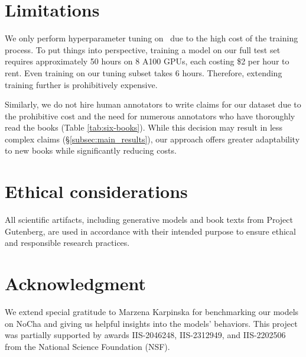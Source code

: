 \section*{Limitations}
We only perform hyperparameter tuning on \prolongbase\ due to the high cost of the training process. To put things into perspective, training a model on our full test set requires approximately 50 hours on 8 A100 GPUs, each costing \$2 per hour to rent. Even training on our tuning subset takes 6 hours. Therefore, extending training further is prohibitively expensive. 

Similarly, we do not hire human annotators to write claims for our dataset due to the prohibitive cost and the need for numerous annotators who have thoroughly read the books (Table \ref{tab:six-books}). While this decision may result in less complex claims (\S\ref{subsec:main_results}), our approach offers greater adaptability to new books while significantly reducing costs.

\section*{Ethical considerations}
All scientific artifacts, including generative models and book texts from Project Gutenberg, are used in accordance with their intended purpose to ensure ethical and responsible research practices. 

\section*{Acknowledgment}

We extend special gratitude to Marzena Karpinska for benchmarking our models on NoCha and giving us helpful insights into the models' behaviors. This project was partially supported by awards IIS-2046248, IIS-2312949, and IIS-2202506 from the National Science Foundation (NSF). 